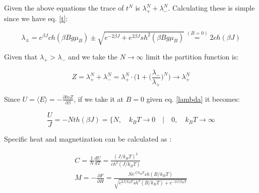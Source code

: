 \documentclass[12pt]{article}
\theoremstyle{plain}
\begin{document}
\vspace{2mm}

\par Given the above equations the trace of $t^N$ is $\lambda_+^N + \lambda_-^N$.
Calculating these is simple since we have eq. \ref{t}:

\vspace{2mm}

\begin{equation}
    \lambda_{\pm} = e^{\beta J}ch(\beta B g \mu_B) \pm \sqrt{e^{-2\beta J} + e^{2\beta J}sh^{2}(\beta B g \mu_B)} \stackrel{(B = 0)}{=} 2 ch(\beta J)
    \label{lambda}
\end{equation}

\vspace{2mm}

\par Given that $\lambda_+ > \lambda_-$ and we take the $N \rightarrow \infty$ limit the partition function is:

\vspace{2mm}

\begin{equation*}
    Z = \lambda_+^{N} + \lambda_-^N = \lambda_+^N\cdot \Big( 1 + \Big(\frac{\lambda_-}{\lambda_+}\Big)^N\Big) \rightarrow \lambda_+^N
\end{equation*}

\vspace{2mm}

\par Since $U = \langle E \rangle = - \frac{\partial lnZ}{\partial \beta}$, if we take it at $B = 0$
given eq. \ref{lambda} it becomes:

\vspace{2mm}

\begin{equation*}
    \frac{U}{J} = -Nth(\beta J) = \Big\{N, \quad k_B T \rightarrow 0 \quad | \quad 0, \quad k_B T \rightarrow \infty
\end{equation*}

\vspace{2mm}

\par Specific heat and magnetization can be calculated as \cite{landau}:

\vspace{2mm}

\begin{align*}
    C = \frac{1}{N}\frac{dU}{dT} = \frac{(J / k_B T)^2}{ch^{2}(J / k_B T)} \\
    M = -\frac{\partial F}{\partial H} = \frac{Ne^{J/k_B T}sh(B / k_B T)}{\sqrt{e^{2J/k_B T}sh^2(B/k_B T) + e^{-2J/k_B T}}}
\end{align*}
\end{document}
